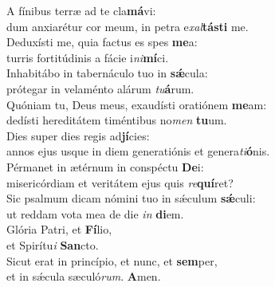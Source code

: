 \evenverse A fínibus terræ ad te cla\textbf{má}vi:~\*\\
\evenverse dum anxiarétur cor meum, in petra e\textit{xal}\textbf{tá}\textbf{sti} me.\\
\oddverse Deduxísti me, quia factus es spes \textbf{me}a:~\*\\
\oddverse turris fortitúdinis a fácie i\textit{ni}\textbf{mí}ci.\\
\evenverse Inhabitábo in tabernáculo tuo in \textbf{sǽ}cula:~\*\\
\evenverse prótegar in velaménto alárum \textit{tu}\textbf{á}rum.\\
\oddverse Quóniam tu, Deus meus, exaudísti oratiónem \textbf{me}am:~\*\\
\oddverse dedísti hereditátem timéntibus no\textit{men} \textbf{tu}um.\\
\evenverse Dies super dies regis ad\textbf{jí}cies:~\*\\
\evenverse annos ejus usque in diem generatiónis et genera\textit{ti}\textbf{ó}nis.\\
\oddverse Pérmanet in ætérnum in conspéctu \textbf{De}i:~\*\\
\oddverse misericórdiam et veritátem ejus quis \textit{re}\textbf{quí}ret?\\
\evenverse Sic psalmum dicam nómini tuo in sǽculum \textbf{sǽ}culi:~\*\\
\evenverse ut reddam vota mea de die \textit{in} \textbf{di}em.\\
\oddverse Glória Patri, et \textbf{Fí}lio,~\*\\
\oddverse et Spirítu\textit{i} \textbf{San}cto.\\
\evenverse Sicut erat in princípio, et nunc, et \textbf{sem}per,~\*\\
\evenverse et in sǽcula sæculó\textit{rum}. \textbf{A}men.\\
